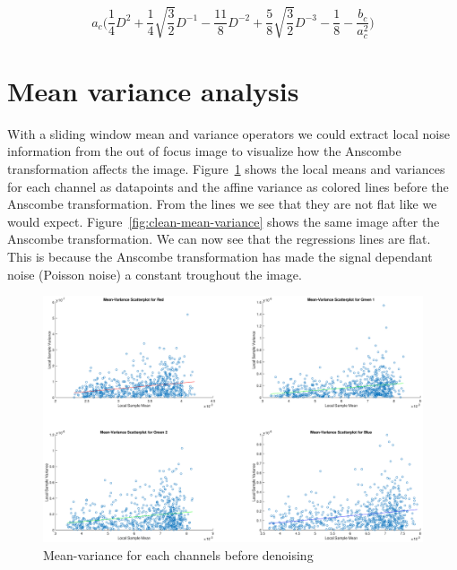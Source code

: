 \documentclass[12pt,a4paper,english
]{tunithesis}
\begin{document}
\begin{equation}
\label{eq:anscombe-inv}
  a_{c} \Bigg( \frac{1}{4}D^2 + \frac{1}{4}\sqrt{\frac{3}{2}}D^{-1} - \frac{11}{8}D^{-2} + \frac{5}{8} \sqrt{\frac{3}{2}}D^{-3} - \frac{1}{8} - \frac{b_{c}}{a_{c}^2} \Bigg)
  \end{equation}

\section{Mean variance analysis}
With a sliding window mean and variance operators we could extract local noise information from the out of focus image to visualize how the Anscombe transformation affects the image. Figure~\ref{fig:noisy-mean-variance} shows the local means and variances for each channel as datapoints and the affine variance as colored lines before the Anscombe transformation. From the lines we see that they are not flat like we would expect. Figure~\ref{fig:clean-mean-variance} shows the same image after the Anscombe transformation. We can now see that the regressions lines are flat. This is because the Anscombe transformation has made the signal dependant noise (Poisson noise) a constant troughout the image.

\begin{figure}
  \includegraphics[width=\textwidth]{img/noisy-mean-variance.eps}
  \caption{Mean-variance for each channels before denoising}
  \label{fig:noisy-mean-variance}
\end{figure}
\end{document}
